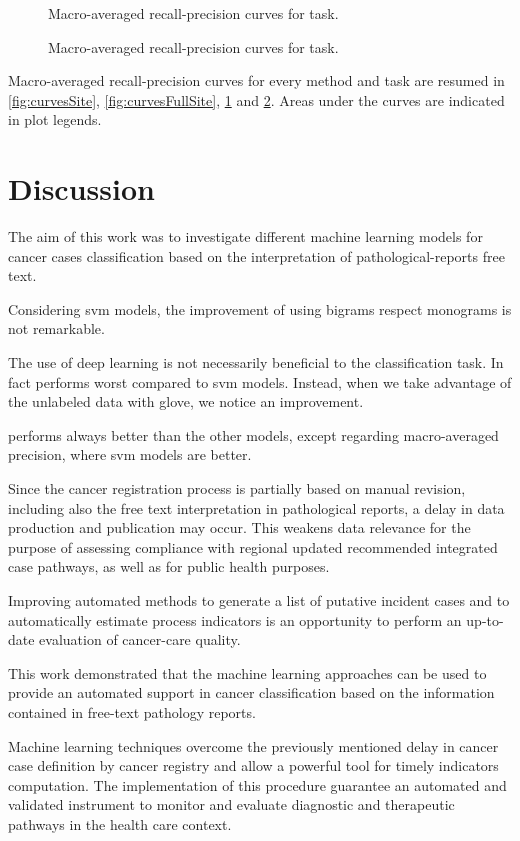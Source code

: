 \begin{figure}
  \centering
  \resizebox{0.9\textwidth}{!}{}
  \caption{Macro-averaged recall-precision curves for \type{} task.}
  \label{fig:curvesType}
\end{figure}

\begin{figure}
  \centering
  \resizebox{0.9\textwidth}{!}{}
  \caption{Macro-averaged recall-precision curves for \behaviour{} task.}
  \label{fig:curvesBehaviour}
\end{figure}

Macro-averaged recall-precision curves for every method and task are
resumed in \cref{fig:curvesSite}, \cref{fig:curvesFullSite},
\cref{fig:curvesType} and
\cref{fig:curvesBehaviour}. Areas under the curves are indicated in
plot legends.

\section{Discussion}
The aim of this work was to investigate different machine learning
models for cancer cases classification based on the interpretation
of pathological-reports free text.

Considering \ac{svm} models, the improvement of using
bigrams respect monograms is not remarkable.

The use of deep learning is not necessarily beneficial to the
classification task. In fact \lstmng{}
performs worst compared to \ac{svm} models. Instead, when we take
advantage of the unlabeled data with \ac{glove}, we notice an
improvement.

\lstmb{} performs always better than the other models, except
regarding macro-averaged precision, where \ac{svm} models are better.

Since the cancer registration process is partially based on manual
revision, including also the free text interpretation in pathological
reports, a delay in data production and publication may occur. This
weakens data relevance for the purpose of assessing compliance with
regional updated recommended integrated case pathways, as well as for
public health purposes.

Improving automated methods to generate a list of putative incident
cases and to automatically estimate process indicators is an
opportunity to perform an up-to-date evaluation of cancer-care
quality.

This work demonstrated that the machine learning approaches can be
used to provide an automated support in cancer classification based on
the information contained in free-text pathology reports.

Machine learning techniques overcome the previously mentioned
delay in cancer case definition by cancer registry and allow a
powerful tool for timely indicators computation. The implementation of
this procedure guarantee an automated and validated instrument to
monitor and evaluate diagnostic and therapeutic pathways in the
health care context.


